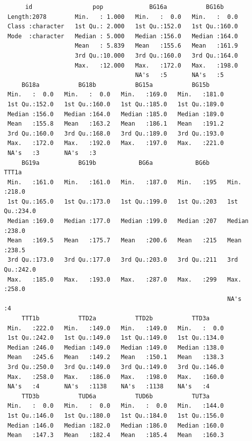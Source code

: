 \documentclass[
  letterpaper,
  DIV=11,
  numbers=noendperiod]{scrreprt}
\begin{document}
\begin{tcolorbox}
\begin{verbatim}
      id                 pop             BG16a           BG16b      
 Length:2078        Min.   : 1.000   Min.   :  0.0   Min.   :  0.0  
 Class :character   1st Qu.: 2.000   1st Qu.:152.0   1st Qu.:160.0  
 Mode  :character   Median : 5.000   Median :156.0   Median :164.0  
                    Mean   : 5.839   Mean   :155.6   Mean   :161.9  
                    3rd Qu.:10.000   3rd Qu.:160.0   3rd Qu.:164.0  
                    Max.   :12.000   Max.   :172.0   Max.   :198.0  
                                     NA's   :5       NA's   :5      
     BG18a           BG18b           BG15a           BG15b      
 Min.   :  0.0   Min.   :  0.0   Min.   :169.0   Min.   :181.0  
 1st Qu.:152.0   1st Qu.:160.0   1st Qu.:185.0   1st Qu.:189.0  
 Median :156.0   Median :164.0   Median :185.0   Median :189.0  
 Mean   :155.8   Mean   :163.2   Mean   :186.1   Mean   :191.2  
 3rd Qu.:160.0   3rd Qu.:168.0   3rd Qu.:189.0   3rd Qu.:193.0  
 Max.   :172.0   Max.   :192.0   Max.   :197.0   Max.   :221.0  
 NA's   :3       NA's   :3                                      
     BG19a           BG19b            BG6a            BG6b         TTT1a      
 Min.   :161.0   Min.   :161.0   Min.   :187.0   Min.   :195   Min.   :218.0  
 1st Qu.:165.0   1st Qu.:173.0   1st Qu.:199.0   1st Qu.:203   1st Qu.:234.0  
 Median :169.0   Median :177.0   Median :199.0   Median :207   Median :238.0  
 Mean   :169.5   Mean   :175.7   Mean   :200.6   Mean   :215   Mean   :238.5  
 3rd Qu.:173.0   3rd Qu.:177.0   3rd Qu.:203.0   3rd Qu.:211   3rd Qu.:242.0  
 Max.   :185.0   Max.   :193.0   Max.   :287.0   Max.   :299   Max.   :258.0  
                                                               NA's   :4      
     TTT1b           TTD2a           TTD2b           TTD3a      
 Min.   :222.0   Min.   :149.0   Min.   :149.0   Min.   :  0.0  
 1st Qu.:242.0   1st Qu.:149.0   1st Qu.:149.0   1st Qu.:134.0  
 Median :246.0   Median :149.0   Median :149.0   Median :138.0  
 Mean   :245.6   Mean   :149.2   Mean   :150.1   Mean   :138.3  
 3rd Qu.:250.0   3rd Qu.:149.0   3rd Qu.:149.0   3rd Qu.:146.0  
 Max.   :258.0   Max.   :186.0   Max.   :198.0   Max.   :160.0  
 NA's   :4       NA's   :1138    NA's   :1138    NA's   :4      
     TTD3b           TUD6a           TUD6b           TUT3a      
 Min.   :  0.0   Min.   :  0.0   Min.   :  0.0   Min.   :144.0  
 1st Qu.:146.0   1st Qu.:180.0   1st Qu.:184.0   1st Qu.:156.0  
 Median :146.0   Median :182.0   Median :186.0   Median :160.0  
 Mean   :147.3   Mean   :182.4   Mean   :185.4   Mean   :160.3  

\end{verbatim}
\end{tcolorbox}
\end{document}
